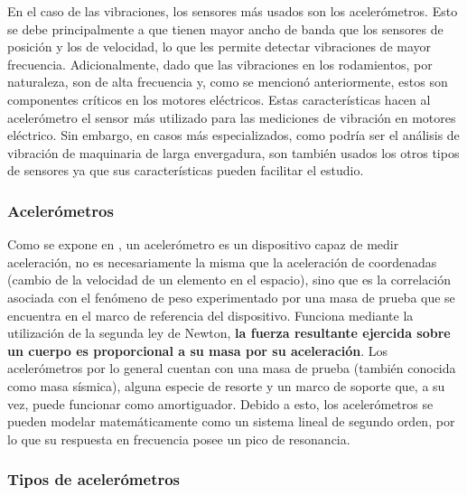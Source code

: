 En el caso de las vibraciones, los sensores más usados son los
acelerómetros.  Esto se debe principalmente a que tienen mayor ancho de banda
que los sensores de posición y los de velocidad, lo que les permite detectar
vibraciones de mayor frecuencia. Adicionalmente, dado que las vibraciones en los
rodamientos, por naturaleza, son de alta frecuencia y, como se mencionó anteriormente,
estos son componentes críticos en los motores eléctricos.
Estas características hacen al acelerómetro el sensor más utilizado para las
mediciones de vibración en motores eléctrico. Sin embargo,
en casos más especializados, como podría ser el análisis de vibración
de maquinaria de larga envergadura, son también usados los otros tipos de
sensores ya que sus características pueden facilitar el estudio.


\subsubsection{Acelerómetros}

Como se expone en \cite{Fraden}, un acelerómetro es un dispositivo capaz de
medir aceleración, no es
necesariamente la misma que la aceleración de coordenadas (cambio de la velocidad de
un elemento en el espacio), sino que es la correlación asociada con el fenómeno
de peso experimentado por una masa de prueba que se
encuentra en el marco de referencia del dispositivo.  Funciona mediante
la utilización de la segunda ley de Newton, \textbf{la fuerza resultante
ejercida sobre un cuerpo es proporcional a su masa por su aceleración}. Los
acelerómetros por lo general cuentan con una masa de prueba (también conocida
como masa sísmica), alguna especie de resorte y un marco de soporte que, a su
vez, puede funcionar como amortiguador. Debido a esto, los acelerómetros se
pueden modelar matemáticamente como un sistema lineal de segundo orden,
por lo que su respuesta en frecuencia posee un pico de resonancia.


\subsubsection*{Tipos de acelerómetros}

